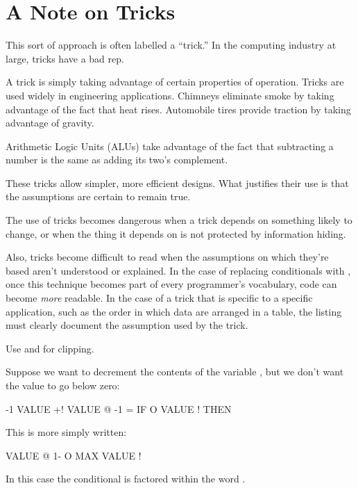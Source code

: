\section{A Note on Tricks}%

This sort of approach is often labelled a ``trick.'' In the computing
industry at large, tricks have a bad rep.

A trick is simply taking advantage of certain properties of operation.
Tricks are used widely in engineering applications. Chimneys
eliminate smoke by taking advantage of the fact that heat rises.
Automobile tires provide traction by taking advantage of gravity.

Arithmetic Logic Units (ALUs) take advantage of the fact that
subtracting a number is the same as adding its two's complement.

These tricks allow simpler, more efficient designs. What justifies
their use is that the assumptions are certain to remain true.

The use of tricks becomes dangerous when a trick depends on something
likely to change, or when the thing it depends on is not protected by
information hiding.

Also, tricks become difficult to read when the assumptions on which
they're based aren't understood or explained. In the case of replacing
conditionals with , once this technique becomes part of every
programmer's vocabulary, code can become \emph{more} readable. In the case of
a trick that is specific to a specific application, such as the order in which
data are arranged in a table, the listing must clearly document the
assumption used by the trick.%

\begin{tip}
Use  and  for clipping.
\end{tip}
Suppose we want to decrement the contents of the variable , but
we don't want the value to go below zero:

\begin{Code}
-1 VALUE +!  VALUE @  -1 = IF  O VALUE !  THEN
\end{Code}
This is more simply written:

\begin{Code}
VALUE @  1-  O MAX  VALUE !
\end{Code}
In this case the conditional is factored within the word .

